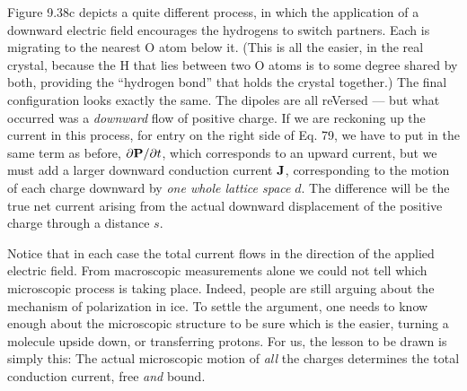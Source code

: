 Figure 9.38c depicts a quite different process, in which the application
of a downward electric field encourages the hydrogens to switch
partners. Each is migrating to the nearest O atom below it. (This
is all the easier, in the real crystal, because the H that lies between
two O atoms is to some degree shared by both, providing 
the ``hydrogen bond'' that holds the crystal together.) The final configuration
looks exactly the same. The dipoles are all reVersed --- but what occurred
was a \emph{downward} flow of positive charge. If we are reckoning
up the current in this process, for entry on the right side of Eq. 79,
we have to put in the same term as before, $\partial\mathbf{P}/\partial t$, which corresponds
to an upward current, but we must add a larger downward conduction
current $\mathbf{J}$, corresponding to the motion of each charge downward
by \emph{one whole lattice space} $d$. The difference will be the true net 
current arising from the actual downward displacement of the positive
charge through a distance $s$.

Notice that in each case the total current flows in the direction of
the applied electric field. From macroscopic measurements alone
we could not tell which microscopic process is taking place. Indeed,
people are still arguing about the mechanism of polarization in ice.
To settle the argument, one needs to know enough about the microscopic
structure to be sure which is the easier, turning a molecule
upside down, or transferring protons. For us, the lesson to be drawn
is simply this: The actual microscopic motion of \emph{all} the charges determines
the total conduction current, free \emph{and} bound.

